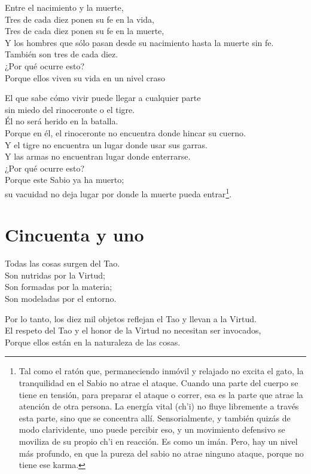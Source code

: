 \documentclass[hidelinks]{memoir}
\begin{document}
	Entre el nacimiento y la muerte,\\
	Tres de cada diez ponen su fe en la vida,\\
	Tres de cada diez ponen su fe en la muerte,\\
	Y los hombres que sólo pasan desde su nacimiento hasta la muerte sin
	fe.\\
	También son tres de cada diez.\\
	¿Por qué ocurre esto?\\
	Porque ellos viven su vida en un nivel craso
	
	El que sabe cómo vivir puede llegar a cualquier parte\\
	sin miedo del rinoceronte o el tigre.\\
	Él no será herido en la batalla.\\
	Porque en él, el rinoceronte no encuentra donde hincar su cuerno.\\
	Y el tigre no encuentra un lugar donde usar sus garras.\\
	Y las armas no encuentran lugar donde enterrarse.\\
	¿Por qué ocurre esto?\\
	Porque este Sabio ya ha muerto;\\
	su vacuidad no deja lugar por donde la muerte pueda entrar\footnote{Tal como el ratón que, permaneciendo inmóvil y relajado no excita el
		gato, la tranquilidad en el Sabio no atrae el ataque. Cuando una parte
		del cuerpo se tiene en tensión, para preparar el ataque o correr, esa es
		la parte que atrae la atención de otra persona. La energía vital (ch'i)
		no fluye libremente a través esta parte, sino que se concentra allí.
		Sensorialmente, y también quizás de modo clarividente, uno puede
		percibir eso, y un movimiento defensivo se moviliza de su propio ch'i en
		reacción. Es como un imán. Pero, hay un nivel más profundo, en que la
		pureza del sabio no atrae ninguno ataque, porque no tiene ese karma.}.
	
	\chapter*{Cincuenta y uno}
	
	Todas las cosas surgen del Tao.\\
	Son nutridas por la Virtud;\\
	Son formadas por la materia;\\
	Son modeladas por el entorno.
	
	Por lo tanto, los diez mil objetos reflejan el Tao y llevan a la
	Virtud.\\
	El respeto del Tao y el honor de la Virtud no necesitan ser invocados,\\
	Porque ellos están en la naturaleza de las cosas.
	
\end{document}
